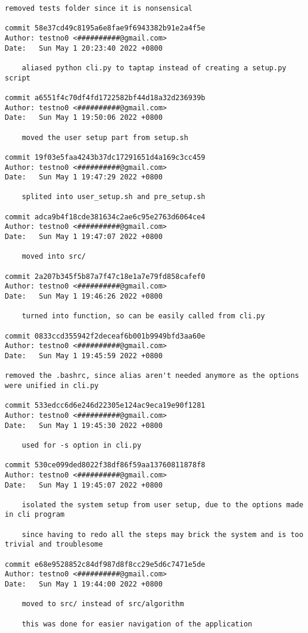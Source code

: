 \documentclass[12pt]{article}
\begin{document}
\begin{lstlisting}[caption={\texttt{git} log of the development.}]
	removed tests folder since it is nonsensical

commit 58e37cd49c8195a6e8fae9f6943382b91e2a4f5e
Author: testno0 <##########@gmail.com>
Date:   Sun May 1 20:23:40 2022 +0800

	aliased python cli.py to taptap instead of creating a setup.py script

commit a6551f4c70df4fd1722582bf44d18a32d236939b
Author: testno0 <##########@gmail.com>
Date:   Sun May 1 19:50:06 2022 +0800

	moved the user setup part from setup.sh

commit 19f03e5faa4243b37dc17291651d4a169c3cc459
Author: testno0 <##########@gmail.com>
Date:   Sun May 1 19:47:29 2022 +0800

	splited into user_setup.sh and pre_setup.sh

commit adca9b4f18cde381634c2ae6c95e2763d6064ce4
Author: testno0 <##########@gmail.com>
Date:   Sun May 1 19:47:07 2022 +0800

	moved into src/

commit 2a207b345f5b87a7f47c18e1a7e79fd858cafef0
Author: testno0 <##########@gmail.com>
Date:   Sun May 1 19:46:26 2022 +0800

	turned into function, so can be easily called from cli.py

commit 0833ccd355942f2deceaf6b001b9949bfd3aa60e
Author: testno0 <##########@gmail.com>
Date:   Sun May 1 19:45:59 2022 +0800

removed the .bashrc, since alias aren't needed anymore as the options were unified in cli.py

commit 533edcc6d6e246d22305e124ac9eca19e90f1281
Author: testno0 <##########@gmail.com>
Date:   Sun May 1 19:45:30 2022 +0800

	used for -s option in cli.py

commit 530ce099ded8022f38df86f59aa13760811878f8
Author: testno0 <##########@gmail.com>
Date:   Sun May 1 19:45:07 2022 +0800

	isolated the system setup from user setup, due to the options made in cli program

	since having to redo all the steps may brick the system and is too trivial and troublesome

commit e68e9528852c84df987d8f8cc29e5d6c7471e5de
Author: testno0 <##########@gmail.com>
Date:   Sun May 1 19:44:00 2022 +0800

	moved to src/ instead of src/algorithm

	this was done for easier navigation of the application


\end{lstlisting}
\end{document}
